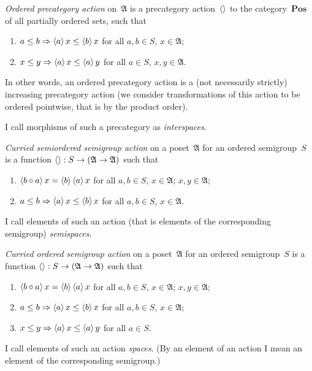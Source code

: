 \documentclass{amsart}
\begin{document}
\begin{defn}
\emph{Ordered precategory action} on~$\mathfrak{A}$ is a precategory action~$\left\langle \right\rangle$ to the category~$\mathbf{Pos}$ of all partially ordered sets, such that
\begin{enumerate}
\item $a\leq b\Rightarrow\left\langle a\right\rangle x\leq \left\langle b\right\rangle x$ for all $a,b\in S$, $x\in\mathfrak{A}$;
\item $x\leq y\Rightarrow\left\langle a\right\rangle x\leq \left\langle a\right\rangle y$ for all $a\in S$, $x,y\in\mathfrak{A}$.
\end{enumerate}
In other words, an ordered precategory action is a (not necessarily strictly) increasing precategory action (we consider transformations of this action to be ordered pointwise, that is by the product order).

I call morphisms of such a precategory as \emph{interspaces}.
\end{defn}

\begin{defn}
\emph{Curried semiordered semigroup action} on a poset~$\mathfrak{A}$ for an ordered semigroup~$S$ is a function $\left\langle \right\rangle:S\to(\mathfrak{A}\to\mathfrak{A})$ such that
\begin{enumerate}
\item $\left\langle b\circ a\right\rangle x = \left\langle b\right\rangle\left\langle a\right\rangle x$ for all $a,b\in S$, $x\in\mathfrak{A}$;
$x,y\in\mathfrak{A}$;
\item $a\leq b\Rightarrow\left\langle a\right\rangle x\leq \left\langle b\right\rangle x$ for all $a,b\in S$, $x\in\mathfrak{A}$.
\end{enumerate}
I call elements of such an action (that is elements of the corresponding semigroup) \emph{semispaces}.
\end{defn}

\begin{defn}
\emph{Curried ordered semigroup action} on a poset~$\mathfrak{A}$ for an ordered semigroup~$S$ is a function $\left\langle \right\rangle:S\to(\mathfrak{A}\to\mathfrak{A})$ such that
\begin{enumerate}
\item $\left\langle b\circ a\right\rangle x = \left\langle b\right\rangle\left\langle a\right\rangle x$ for all $a,b\in S$, $x\in\mathfrak{A}$;
$x,y\in\mathfrak{A}$;
\item $a\leq b\Rightarrow\left\langle a\right\rangle x\leq \left\langle b\right\rangle x$ for all $a,b\in S$, $x\in\mathfrak{A}$;
\item $x\leq y\Rightarrow\left\langle a\right\rangle x\leq \left\langle a\right\rangle y$ for all $a\in S$.
\end{enumerate}
I call elements of such an action \emph{spaces}. (By an element of an action I mean an element of the corresponding semigroup.)
\end{defn}
\end{document}
